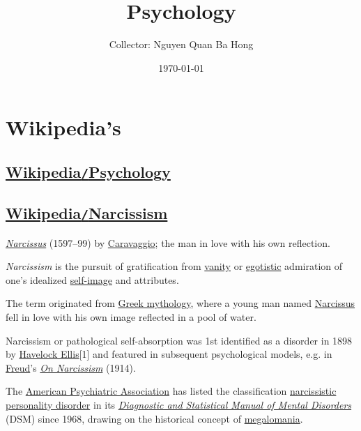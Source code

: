 \documentclass[oneside]{book}
\title{Psychology}
\author{Collector: Nguyen Quan Ba Hong}
\date{\today}
\numberwithin{equation}{section}
\begin{document}
\maketitle
\setcounter{secnumdepth}{6}
\tableofcontents


\chapter{Wikipedia's}

\section{\href{https://en.wikipedia.org/wiki/Psychology}{Wikipedia\texttt{/}Psychology}}



\section{\href{https://en.wikipedia.org/wiki/Narcissism}{Wikipedia\texttt{/}Narcissism}}
\textsf{\href{https://en.wikipedia.org/wiki/Narcissus_(Caravaggio)}{\textit{Narcissus}} (1597--99) by \href{https://en.wikipedia.org/wiki/Caravaggio}{Caravaggio}; the man in love with his own reflection.}

\textit{Narcissism} is the pursuit of gratification from \href{https://en.wikipedia.org/wiki/Vanity}{vanity} or \href{https://en.wikipedia.org/wiki/Egotistic}{egotistic} admiration of one's idealized \href{https://en.wikipedia.org/wiki/Self-image}{self-image} and attributes.

The term originated from \href{https://en.wikipedia.org/wiki/Greek_mythology}{Greek mythology}, where a young man named \href{https://en.wikipedia.org/wiki/Narcissus_(mythology)}{Narcissus} fell in love with his own image reflected in a pool of water.

Narcissism or pathological self-absorption was 1st identified as a disorder in 1898 by \href{https://en.wikipedia.org/wiki/Havelock_Ellis}{Havelock Ellis}[1] and featured in subsequent psychological models, e.g. in \href{https://en.wikipedia.org/wiki/Sigmund_Freud}{Freud}'s \href{https://en.wikipedia.org/wiki/On_Narcissism}{\textit{On Narcissism}} (1914).

The \href{https://en.wikipedia.org/wiki/American_Psychiatric_Association}{American Psychiatric Association} has listed the classification \href{https://en.wikipedia.org/wiki/Narcissistic_personality_disorder}{narcissistic personality disorder} in its \href{https://en.wikipedia.org/wiki/Diagnostic_and_Statistical_Manual_of_Mental_Disorders}{\textit{Diagnostic and Statistical Manual of Mental Disorders}} (DSM) since 1968, drawing on the historical concept of \href{https://en.wikipedia.org/wiki/Megalomania}{megalomania}.
\end{document}
